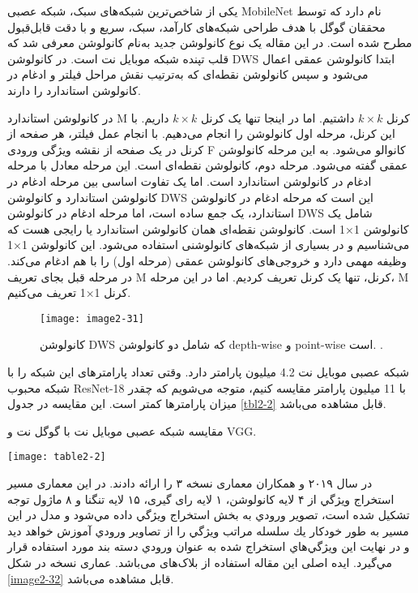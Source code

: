 \noindent
یکی از شاخص‌ترین شبکه‌های سبک، شبکه عصبی MobileNet نام دارد که توسط محققان گوگل \cite{howard2017mobilenets} با هدف طراحی شبکه‌های کارآمد، سبک، سریع و با دقت قابل‌قبول مطرح شده است. در این مقاله یک نوع کانولوشن جدید به‌نام کانولوشن   معرفی شد که قلب تپنده شبکه موبایل نت است. در کانولوشن DWS ابتدا کانولوشن عمقی اعمال می‌شود و سپس کانولوشن نقطه‌ای که به‌ترتیب نقش مراحل فیلتر و ادغام در کانولوشن استاندارد را دارند. 

\noindent
در کانولوشن استاندارد M کرنل $k \times k$ داشتیم. اما در اینجا تنها یک کرنل $k \times k$ داریم. با این کرنل، مرحله اول کانولوشن را انجام می‌دهیم. با انجام عمل فیلتر، هر صفحه از کرنل در یک صفحه از نقشه ویژگی ورودی F کانوالو می‌شود. به این مرحله کانولوشن عمقی گفته می‌شود.  مرحله دوم، کانولوشن نقطه‌ای  است. این مرحله معادل با مرحله ادغام در کانولوشن استاندارد است. اما یک تفاوت اساسی بین مرحله ادغام در کانولوشن استاندارد و کانولوشن DWS این است که مرحله ادغام در کانولوشن استاندارد، یک جمع ساده است، اما مرحله ادغام در کانولوشن DWS شامل یک کانولوشن 1×1 است. کانولوشن نقطه‌ای همان کانولوشن استاندارد یا رایجی هست که می‌شناسیم و در بسیاری از شبکه‌های کانولوشنی استفاده می‌شود. این کانولوشن 1×1 وظیفه مهمی دارد و خروجی‌های کانولوشن عمقی (مرحله اول) را با هم ادغام می‌کند. در مرحله قبل بجای تعریف M کرنل، تنها یک کرنل تعریف کردیم. اما در این مرحله، M کرنل 1×1 تعریف می‌کنیم.

\begin{figure}[h]
\centering
  \texttt{[image: image2-31]}
  \caption{
  کانولوشن DWS که شامل دو کانولوشن depth-wise و point-wise است. 
   \cite{howard2017mobilenets}.}
  \label{image2-31}
\end{figure}

\noindent
شبکه عصبی موبایل نت 4.2 میلیون پارامتر دارد. وقتی تعداد پارامترهای این شبکه را با شبکه محبوب ResNet-18 با 11 میلیون پارامتر مقایسه کنیم، متوجه می‌شویم که چقدر میزان پارامترها کمتر است. این مقایسه در جدول \ref{tbl2-2} قابل مشاهده می‌باشد.

\begin{table}
\centering
  \caption{ مقایسه شبکه عصبی موبایل نت با گوگل نت و VGG.}
  \label{tbl2-2}
  \texttt{[image: table2-2]}
\end{table}

\noindent
در سال ۲۰۱۹   و همکاران \cite{howard2019searching} معماری  نسخه ۳ را ارائه دادند. در این معماری مسير استخراج ويژگي از ۴ لايه كانولوشن، ۱ لایه رای گیری، ۱۵ لايه تنگنا   و ۸ ماژول توجه  تشکیل شده است، تصوير ورودي به بخش استخراج ويژگي داده مي‌شود و مدل در اين مسير به طور خودكار يك سلسله مراتب ويژگي را از تصاوير ورودي آموزش خواهد ديد و در نهايت اين ويژگي‌هاي استخراج شده به عنوان ورودي دسته بند مورد استفاده قرار مي‌گيرد. ایده اصلی این مقاله استفاده از بلاک‌های  می‌باشد. عماری  نسخه  در شکل \ref{image2-32} قابل مشاهده می‌باشد. 

